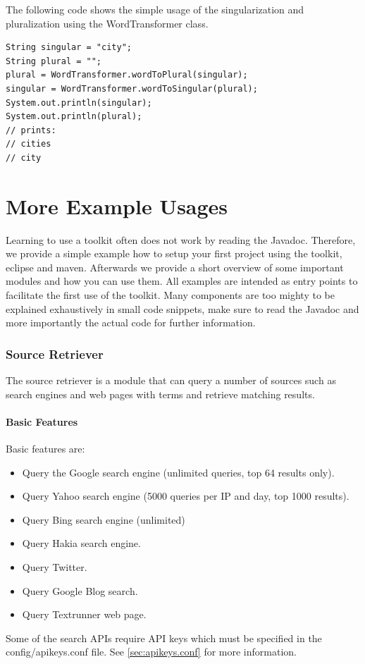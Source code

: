 \documentclass[a4paper,twoside]{book}      %
\begin{document}
The following code shows the simple usage of the singularization and pluralization using the WordTransformer class.
\begin{codelisting}
\begin{lstlisting}[frame=tb]
String singular = "city";
String plural = "";
plural = WordTransformer.wordToPlural(singular);
singular = WordTransformer.wordToSingular(plural);
System.out.println(singular);
System.out.println(plural);
// prints:
// cities
// city
\end{lstlisting}
\end{codelisting}

\chapter{More Example Usages}
Learning to use a toolkit often does not work by reading the Javadoc. Therefore, we provide a simple example how to setup your first project using the toolkit, eclipse and maven. Afterwards we provide a short overview of some important modules and how you can use them. All examples are intended as entry points to facilitate the first use of the toolkit. Many components are too mighty to be explained exhaustively in small code snippets, make sure to read the Javadoc and more importantly the actual code for further information.

\subsection{Source Retriever}
The source retriever is a module that can query a number of sources such as search engines and web pages with terms and retrieve matching results.
\subsubsection{Basic Features}
Basic features are:
\begin{itemize}
\item Query the Google search engine (unlimited queries, top 64 results only).
\item Query Yahoo search engine (5000 queries per IP and day, top 1000 results).
\item Query Bing search engine (unlimited)
\item Query Hakia search engine.
\item Query Twitter.
\item Query Google Blog search.
\item Query Textrunner web page.
\end{itemize}
Some of the search APIs require API keys which must be specified in the config/apikeys.conf file. See \ref{sec:apikeys.conf} for more information.
\end{document}
